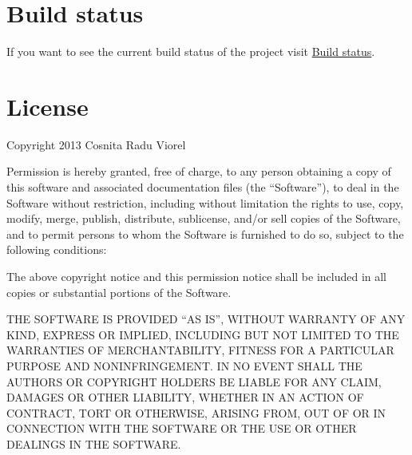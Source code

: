 \documentclass[letterpaper,10pt,english]{sphinxmanual}
\begin{document}
\chapter{Build status}
\label{index:build-status}
If you want to see the current build status of the project visit \href{http://jenkins.scrum-expert.ro:8080/job/fantastico-framework/badge/icon/}{Build status}.


\chapter{License}
\label{index:license}
Copyright 2013 Cosnita Radu Viorel

Permission is hereby granted, free of charge, to any person obtaining a copy of this software and associated
documentation files (the ``Software''), to deal in the Software without restriction, including without limitation
the rights to use, copy, modify, merge, publish, distribute, sublicense, and/or sell copies of the Software,
and to permit persons to whom the Software is furnished to do so, subject to the following conditions:

The above copyright notice and this permission notice shall be included in all copies or substantial portions of the Software.

THE SOFTWARE IS PROVIDED ``AS IS'', WITHOUT WARRANTY OF ANY KIND, EXPRESS OR IMPLIED, INCLUDING BUT NOT LIMITED TO THE
WARRANTIES OF MERCHANTABILITY, FITNESS FOR A PARTICULAR PURPOSE AND NONINFRINGEMENT. IN NO EVENT SHALL THE AUTHORS OR
COPYRIGHT HOLDERS BE LIABLE FOR ANY CLAIM, DAMAGES OR OTHER LIABILITY, WHETHER IN AN ACTION OF CONTRACT, TORT OR OTHERWISE,
ARISING FROM, OUT OF OR IN CONNECTION WITH THE SOFTWARE OR THE USE OR OTHER DEALINGS IN THE SOFTWARE.



\renewcommand{\indexname}{Index}
\printindex
\end{document}
